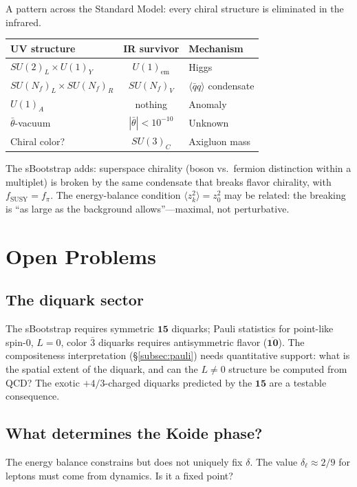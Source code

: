 \documentclass[12pt,a4paper]{article}
\newcommand{\qqbar}{\langle\bar{q}q\rangle}
\begin{document}
A pattern across the Standard Model: every chiral structure is 
eliminated in the infrared.

\begin{center}
\begin{tabular}{lcl}
\toprule
UV structure & IR survivor & Mechanism \\
\midrule
$SU(2)_L \times U(1)_Y$ & $U(1)_{\text{em}}$ & Higgs \\
$SU(N_f)_L \times SU(N_f)_R$ & $SU(N_f)_V$ & $\qqbar$ condensate \\
$U(1)_A$ & nothing & Anomaly \\
$\bar{\theta}$-vacuum & $|\bar{\theta}| < 10^{-10}$ & Unknown \\
Chiral color? & $SU(3)_C$ & Axigluon mass \\
\bottomrule
\end{tabular}
\end{center}

The sBootstrap adds: superspace chirality (boson vs.\ fermion 
distinction within a multiplet) is broken by the same condensate 
that breaks flavor chirality, with $f_{\text{SUSY}} = f_\pi$. The 
energy-balance condition $\langle z_k^2\rangle = z_0^2$ may be 
related: the breaking is ``as large as the background 
allows''---maximal, not perturbative.

\section{Open Problems}
\label{sec:open}

\subsection{The diquark sector}
The sBootstrap requires symmetric $\mathbf{15}$ diquarks; Pauli 
statistics for point-like spin-0, $L=0$, color $\bar{3}$ diquarks 
requires antisymmetric flavor ($\overline{\mathbf{10}}$). The 
compositeness interpretation (\S\ref{subsec:pauli}) needs 
quantitative support: what is the spatial extent of the diquark, 
and can the $L \neq 0$ structure be computed from QCD? The exotic 
$+4/3$-charged diquarks predicted by the $\mathbf{15}$ are a 
testable consequence.

\subsection{What determines the Koide phase?}
The energy balance constrains but does not uniquely fix $\delta$. 
The value $\delta_\ell \approx 2/9$ for leptons must come from 
dynamics. Is it a fixed point?
\end{document}
